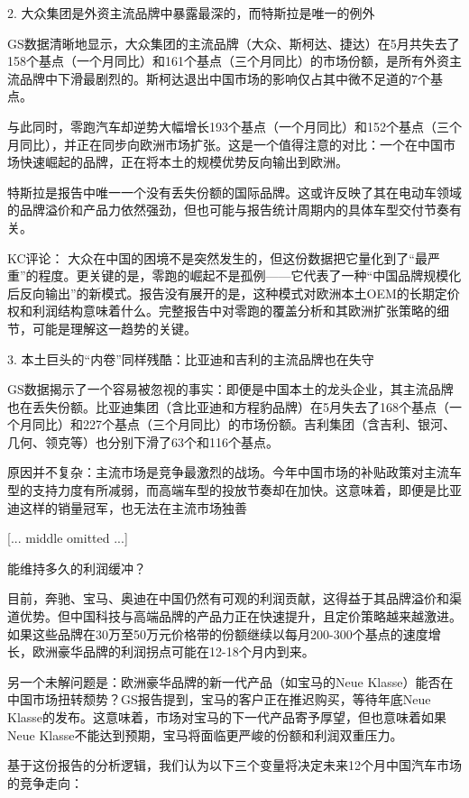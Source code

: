 \documentclass[11pt]{ctexart}
\begin{document}
2. 大众集团是外资主流品牌中暴露最深的，而特斯拉是唯一的例外

GS数据清晰地显示，大众集团的主流品牌（大众、斯柯达、捷达）在5月共失去了158个基点（一个月同比）和161个基点（三个月同比）的市场份额，是所有外资主流品牌中下滑最剧烈的。斯柯达退出中国市场的影响仅占其中微不足道的7个基点。

与此同时，零跑汽车却逆势大幅增长193个基点（一个月同比）和152个基点（三个月同比），并正在同步向欧洲市场扩张。这是一个值得注意的对比：一个在中国市场快速崛起的品牌，正在将本土的规模优势反向输出到欧洲。

特斯拉是报告中唯一一个没有丢失份额的国际品牌。这或许反映了其在电动车领域的品牌溢价和产品力依然强劲，但也可能与报告统计周期内的具体车型交付节奏有关。

KC评论： 大众在中国的困境不是突然发生的，但这份数据把它量化到了“最严重”的程度。更关键的是，零跑的崛起不是孤例——它代表了一种“中国品牌规模化后反向输出”的新模式。报告没有展开的是，这种模式对欧洲本土OEM的长期定价权和利润结构意味着什么。完整报告中对零跑的覆盖分析和其欧洲扩张策略的细节，可能是理解这一趋势的关键。

3. 本土巨头的“内卷”同样残酷：比亚迪和吉利的主流品牌也在失守

GS数据揭示了一个容易被忽视的事实：即便是中国本土的龙头企业，其主流品牌也在丢失份额。比亚迪集团（含比亚迪和方程豹品牌）在5月失去了168个基点（一个月同比）和227个基点（三个月同比）的市场份额。吉利集团（含吉利、银河、几何、领克等）也分别下滑了63个和116个基点。

原因并不复杂：主流市场是竞争最激烈的战场。今年中国市场的补贴政策对主流车型的支持力度有所减弱，而高端车型的投放节奏却在加快。这意味着，即便是比亚迪这样的销量冠军，也无法在主流市场独善

[... middle omitted ...]

能维持多久的利润缓冲？

目前，奔驰、宝马、奥迪在中国仍然有可观的利润贡献，这得益于其品牌溢价和渠道优势。但中国科技与高端品牌的产品力正在快速提升，且定价策略越来越激进。如果这些品牌在30万至50万元价格带的份额继续以每月200-300个基点的速度增长，欧洲豪华品牌的利润拐点可能在12-18个月内到来。

另一个未解问题是：欧洲豪华品牌的新一代产品（如宝马的Neue Klasse）能否在中国市场扭转颓势？GS报告提到，宝马的客户正在推迟购买，等待年底Neue Klasse的发布。这意味着，市场对宝马的下一代产品寄予厚望，但也意味着如果Neue Klasse不能达到预期，宝马将面临更严峻的份额和利润双重压力。

基于这份报告的分析逻辑，我们认为以下三个变量将决定未来12个月中国汽车市场的竞争走向：
\end{document}
